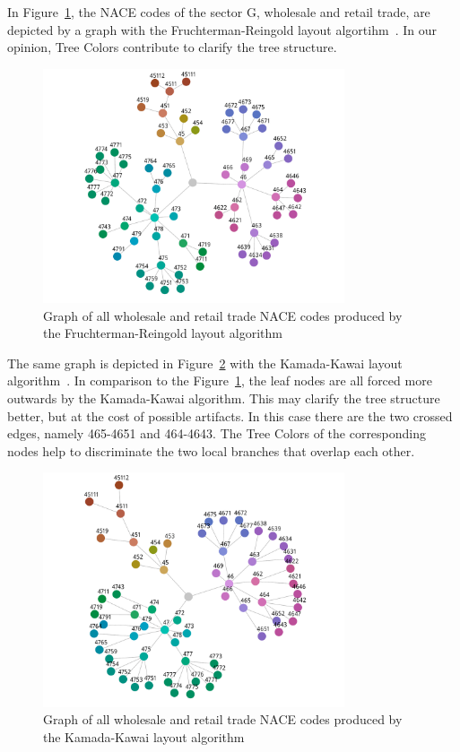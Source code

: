 \documentclass[journal]{vgtc}                %
\begin{document}
In Figure~\ref{fig:graphFRApp}, the NACE codes of the sector G, wholesale and retail trade, are depicted by a graph with the Fruchterman-Reingold layout algortihm~\cite{Fruchterman91}. In our opinion, Tree Colors contribute to clarify the tree structure.

\begin{figure}[tb]
  \centering
  \includegraphics[width=3.5in]{Gbusiness_FR.pdf}
  \caption{Graph of all wholesale and retail trade NACE codes produced by the Fruchterman-Reingold layout algorithm}\label{fig:graphFRApp}
\end{figure}

The same graph is depicted in Figure~\ref{fig:graphKKApp} with the Kamada-Kawai layout algorithm~\cite{Kamada89}. In comparison to the Figure~\ref{fig:graphFRApp}, the leaf nodes are all forced more outwards by the Kamada-Kawai algorithm. This may clarify the tree structure better, but at the cost of possible artifacts. In this case there are the two crossed edges, namely 465-4651 and 464-4643. The Tree Colors of the corresponding nodes help to discriminate the two local branches that overlap each other.



\begin{figure}[tb]
  \centering
  \includegraphics[width=3.5in]{Gbusiness_KK.pdf}
  \caption{Graph of all wholesale and retail trade NACE codes produced by the Kamada-Kawai layout algorithm}\label{fig:graphKKApp}
\end{figure}
\end{document}
